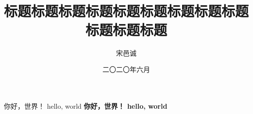 \documentclass[a4paper, 12pt]{HBUThesis}
\date{二〇二〇年六月}
\title{标题标题标题标题标题标题标题标题标题标题标题标题}
\author{宋邑诚}
\begin{document}
\makecover
\makeEncover
\orgState

你好，世界！
hello, world
\bf
你好，世界！
hello, world
\end{document}

